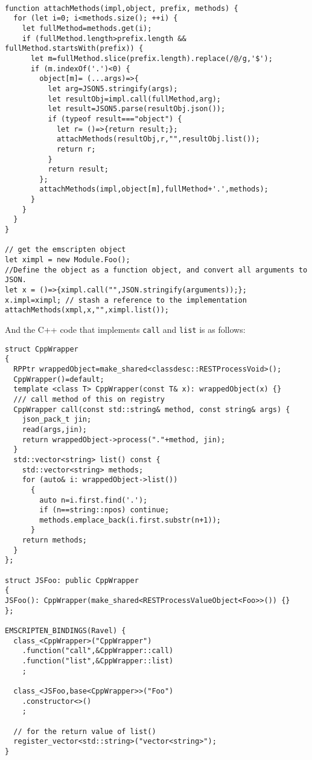 \begin{verbatim}

function attachMethods(impl,object, prefix, methods) {
  for (let i=0; i<methods.size(); ++i) {
    let fullMethod=methods.get(i);
    if (fullMethod.length>prefix.length && fullMethod.startsWith(prefix)) {
      let m=fullMethod.slice(prefix.length).replace(/@/g,'$');
      if (m.indexOf('.')<0) {
        object[m]= (...args)=>{
          let arg=JSON5.stringify(args);
          let resultObj=impl.call(fullMethod,arg);
          let result=JSON5.parse(resultObj.json());
          if (typeof result==="object") {
            let r= ()=>{return result;};
            attachMethods(resultObj,r,"",resultObj.list());
            return r;
          }
          return result; 
        };
        attachMethods(impl,object[m],fullMethod+'.',methods);
      }
    }
  }
}

// get the emscripten object
let ximpl = new Module.Foo();
//Define the object as a function object, and convert all arguments to JSON.
let x = ()=>{ximpl.call("",JSON.stringify(arguments));};  
x.impl=ximpl; // stash a reference to the implementation
attachMethods(xmpl,x,"",ximpl.list());
\end{verbatim}

And the C++ code that implements \verb+call+ and \verb+list+ is as
follows:

\begin{verbatim}
struct CppWrapper
{
  RPPtr wrappedObject=make_shared<classdesc::RESTProcessVoid>();
  CppWrapper()=default;
  template <class T> CppWrapper(const T& x): wrappedObject(x) {}
  /// call method of this on registry
  CppWrapper call(const std::string& method, const string& args) {
    json_pack_t jin;
    read(args,jin);
    return wrappedObject->process("."+method, jin);
  }
  std::vector<string> list() const {
    std::vector<string> methods;
    for (auto& i: wrappedObject->list())
      {
        auto n=i.first.find('.');
        if (n==string::npos) continue;
        methods.emplace_back(i.first.substr(n+1));
      }
    return methods;
  }
};

struct JSFoo: public CppWrapper
{
JSFoo(): CppWrapper(make_shared<RESTProcessValueObject<Foo>>()) {}
};

EMSCRIPTEN_BINDINGS(Ravel) {
  class_<CppWrapper>("CppWrapper")
    .function("call",&CppWrapper::call)
    .function("list",&CppWrapper::list)
    ;

  class_<JSFoo,base<CppWrapper>>("Foo")
    .constructor<>()
    ;

  // for the return value of list()
  register_vector<std::string>("vector<string>");
}
\end{verbatim}

